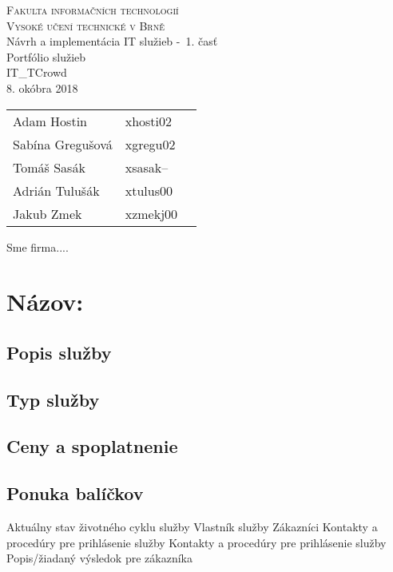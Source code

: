\documentclass[a4paper, 11pt]{article}
\begin{document}
\begin{center}
\Huge
\textsc{Fakulta informačních technologií\\
Vysoké učení technické v Brně}
\\[84mm]
\LARGE Návrh a implementácia IT služieb \--\ 1. časť\\
\Huge Portfólio služieb\\
\vspace{3.5cm}
\LARGE IT\_TCrowd\\
\Large 8. okóbra 2018
\end{center}

\hfill

\begin{minipage}[l]{0.6 \textwidth}
\Large
\begin{tabular}{l l l}
Adam Hostin  & xhosti02\\
Sabína Gregušová & xgregu02\\
Tomáš Sasák & xsasak-- \\
Adrián Tulušák  & xtulus00 \\
Jakub Zmek & xzmekj00 \\
\end{tabular}
\end{minipage}
\thispagestyle{empty}
\clearpage

\setcounter{page}{1}

Sme firma....



\section*{Názov:}
\subsection*{Popis služby}
\subsection*{Typ služby}
\subsection*{Ceny a spoplatnenie}
\subsection*{Ponuka balíčkov}
Aktuálny stav životného cyklu služby
Vlastník služby
Zákazníci
Kontakty a procedúry pre prihlásenie služby
Kontakty a procedúry pre prihlásenie služby
Popis/žiadaný výsledok pre zákazníka
\end{document}
